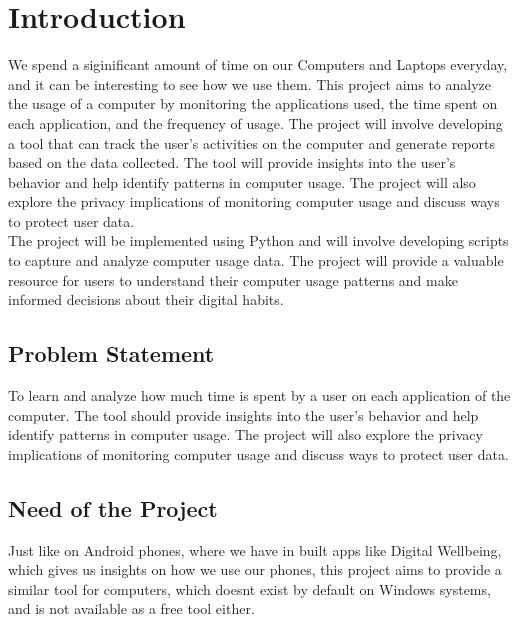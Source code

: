 \documentclass[openany]{report}
\begin{document}
\thispagestyle{empty}
\clearpage

\listoffigures
\clearpage
\setcounter{page}{1}

\chapter{Introduction}
We spend a siginificant amount of time on our Computers and Laptops everyday, and it can be interesting to see how we use them. This project aims to analyze the usage of a computer by monitoring the applications used, the time spent on each application, and the frequency of usage. The project will involve developing a tool that can track the user's activities on the computer and generate reports based on the data collected. The tool will provide insights into the user's behavior and help identify patterns in computer usage. The project will also explore the privacy implications of monitoring computer usage and discuss ways to protect user data.\\

The project will be implemented using Python and will involve developing scripts to capture and analyze computer usage data. The project will provide a valuable resource for users to understand their computer usage patterns and make informed decisions about their digital habits.\\

\section{Problem Statement}
To learn and analyze how much time is spent by a user on each application of the computer. The tool should provide insights into the user's behavior and help identify patterns in computer usage. The project will also explore the privacy implications of monitoring computer usage and discuss ways to protect user data.\\

\section{Need of the Project}

Just like on Android phones, where we have in built apps like Digital Wellbeing, which gives us insights on how we use our phones, this project aims to provide a similar tool for computers, which doesnt exist by default on Windows systems, and is not available as a free tool either.\\
\end{document}
